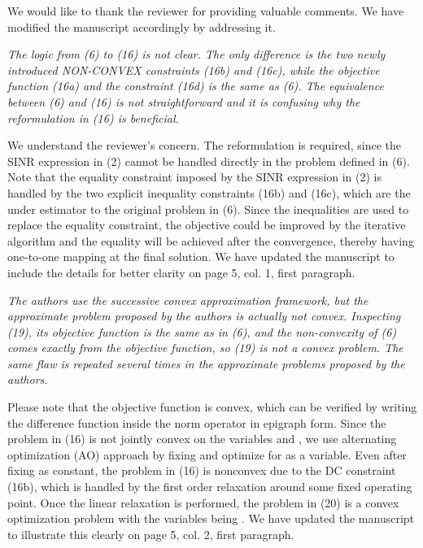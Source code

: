 
We would like to thank the reviewer for providing valuable comments. We have modified the manuscript accordingly by addressing it.

\begin{itemize}

 \textit{The logic from (6) to (16) is not clear. The only difference is the two newly introduced NON-CONVEX constraints (16b) and (16c), while the objective function (16a) and the constraint (16d) is the same as (6). The equivalence between (6) and (16) is not straightforward and it is confusing why the reformulation in (16) is beneficial.}

\resp We understand the reviewer's concern. The reformulation is required, since the SINR expression in (2) cannot be handled directly in the problem defined in (6). Note that the equality constraint imposed by the SINR expression in (2) is handled by the two explicit inequality constraints (16b) and (16c), which are the under estimator to the original problem in (6). Since the inequalities are used to replace the equality constraint, the objective could be improved by the iterative algorithm and the equality will be achieved after the convergence, thereby having one-to-one mapping at the final solution. We have updated the manuscript to include the details for better clarity on page 5, col. 1, first paragraph.

 \textit{The authors use the successive convex approximation framework, but the approximate problem proposed by the authors is actually not convex. Inspecting (19), its objective function is the same as in (6), and the non-convexity of (6) comes exactly from the objective function, so (19) is not a convex problem. The same flaw is repeated several times in the approximate problems proposed by the authors.}

\resp Please note that the objective function is convex, which can be verified by writing the difference function inside the norm operator in epigraph form. Since the problem in (16) is not jointly convex on the variables  and , we use alternating optimization (AO) approach by fixing  and optimize for  as a variable. Even after fixing  as constant, the problem in (16) is nonconvex due to the DC constraint (16b), which is handled by the first order relaxation around some fixed operating point. Once the linear relaxation is performed, the problem in (20) is a convex optimization problem with the variables being . We have updated the manuscript to illustrate this clearly on page 5, col. 2, first paragraph.


\end{itemize}
